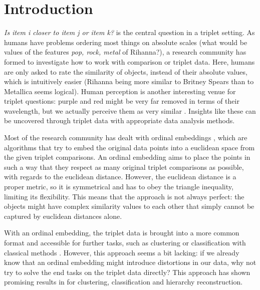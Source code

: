 \chapter{Introduction}\label{Introduction}
\textit{Is item i closer to item j or item k?} is the central question in a triplet setting. As humans have problems ordering 
most things on absolute scales (what would be values of the features \textit{pop, rock, metal} of Rihanna?), a research community has formed
to investigate how to work with comparison or triplet data. Here, humans are only asked to rate the similarity of objects, instead
of their absolute values, which is intuitively easier (Rihanna being more similar to Britney Spears than to Metallica seems logical). 
Human perception is another interesting venue for triplet questions: purple and red might be very far removed in terms of their wavelength,
but we actually perceive them as very similar \citep{shepardAnalysisProximitiesMultidimensional1962}. Insights like these can be uncovered through triplet data 
with appropriate data analysis methods. 

Most of the research community has dealt with ordinal embeddings \citep{agarwalGeneralizedNonmetricMultidimensional2007, tamuzAdaptivelyLearningCrowd2011,
laurensvandermaatenStochasticTripletEmbedding2012,   teradaLocalOrdinalEmbedding2014, jainFiniteSamplePrediction2016, ghoshLandmarkOrdinalEmbedding2019, andertonScalingOrdinalEmbedding2019}, which 
are algorithms that try to embed the original data points into a euclidean space from the given triplet comparisons. An ordinal embedding aims to place the points in such a way
that they respect as many original triplet comparisons as possible, with regards to the euclidean distance. 
However, the euclidean distance is a proper metric, so it is symmetrical and has to obey the triangle inequality, limiting its flexibility. 
This means that the approach is not always perfect: the objects might have complex similarity values to each other that simply cannot be captured by euclidean distances alone. 

With an ordinal embedding, the triplet data is brought into a more common format and accessible for further tasks, such as clustering or classification with classical methods \citep{kleindessnerLensDepthFunction2017}. However, this approach seems a bit lacking: if we already know that an ordinal embedding might introduce distortions in our data, why not try to solve the end tasks on
the triplet data directly? This approach has shown promising results in 
\citep{kleindessnerLensDepthFunction2017, kleindessnerKernelFunctionsBased2017, ghoshdastidarFoundationsComparisonBasedHierarchical2019} for clustering, classification and hierarchy reconstruction. 

